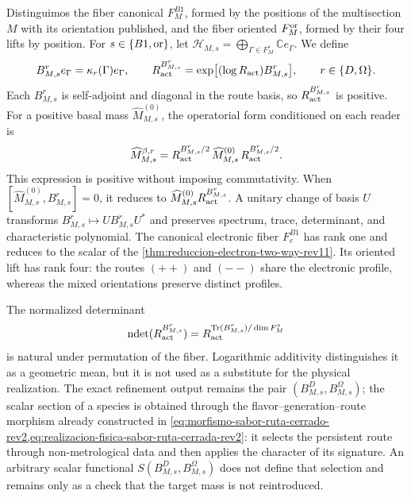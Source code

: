 Distinguimos the fiber canonical \(F_M^{B1}\), formed by the positions of
the multisection \(M\) with its orientation published, and the fiber oriented
\(F_M^{\rm or}\), formed by their four lifts by position. For
\(s\in\{B1,{\rm or}\}\), let
\(\mathcal H_{M,s}=\bigoplus_{\Gamma\in F_M^s}\mathbb C e_\Gamma\). We define
\begin{equation}
 B_{M,s}^r e_\Gamma=\kappa_r(\Gamma)e_\Gamma,
 \qquad
 R_{\rm act}^{B_{M,s}^r}
 =\exp\bigl[(\log R_{\rm act})B_{M,s}^r\bigr],
 \qquad r\in\{D,\Omega\}.
 \label{eq:operadores-fibra-two-way-rev11}
\end{equation}
Each \(B_{M,s}^r\) is self-adjoint and diagonal in the route basis, so
\(R_{\rm act}^{B_{M,s}^r}\) is positive. For a positive basal mass
\(\widehat M_{M,s}^{(0)}\), the operatorial form conditioned on each reader is
\begin{equation}
 \widehat M_{M,s}^{\beta,r}
 =R_{\rm act}^{B_{M,s}^r/2}\,
  \widehat M_{M,s}^{(0)}\,
  R_{\rm act}^{B_{M,s}^r/2}.
 \label{eq:ley-operatoria-fibra-rev11}
\end{equation}
This expression is positive without imposing commutativity. When
\([\widehat M_{M,s}^{(0)},B_{M,s}^r]=0\), it reduces to
\(\widehat M_{M,s}^{(0)}R_{\rm act}^{B_{M,s}^r}\).
A unitary change of basis \(U\) transforms
\(B_{M,s}^r\mapsto UB_{M,s}^rU^*\) and preserves spectrum, trace, determinant, and
characteristic polynomial. The canonical electronic fiber \(F_e^{B1}\) has
rank one and reduces to the scalar of the
\cref{thm:reduccion-electron-two-way-rev11}.
Its oriented lift has rank four: the routes \((++)\) and \((--)\)
share the electronic profile, whereas the mixed orientations preserve
distinct profiles.

The normalized determinant
\[
 \operatorname{ndet}(R_{\rm act}^{B_{M,s}^r})
 =R_{\rm act}^{\operatorname{Tr}(B_{M,s}^r)/\dim F_M^s}
\]
is natural under permutation of the fiber. Logarithmic additivity distinguishes it as a geometric mean, but it is not used as a substitute for the physical realization. The exact refinement output remains the pair \((B_{M,s}^D,B_{M,s}^\Omega)\); the scalar section of a species is obtained through the flavor--generation--route morphism already constructed in \cref{eq:morfismo-sabor-ruta-cerrado-rev2,eq:realizacion-fisica-sabor-ruta-cerrada-rev2}: it selects the persistent route through non-metrological data and then applies the character of its signature. An arbitrary scalar functional \(S(B_{M,s}^D,B_{M,s}^\Omega)\) does not define that selection and remains only as a check that the target mass is not reintroduced.

